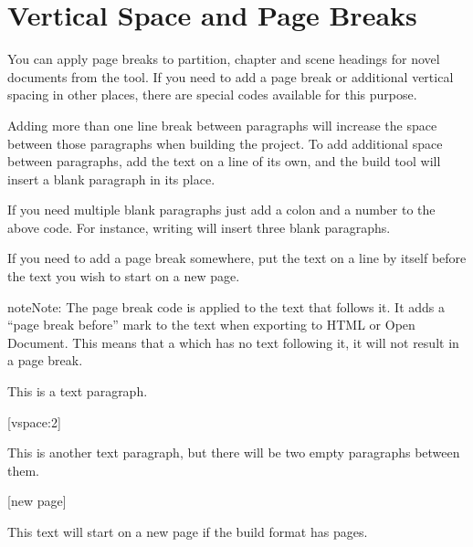 \documentclass[a4paper,11pt,english]{sphinxmanual}
\begin{document}
\section{Vertical Space and Page Breaks}
\label{\detokenize{usage_format:vertical-space-and-page-breaks}}\label{\detokenize{usage_format:a-fmt-break}}
\sphinxAtStartPar
You can apply page breaks to partition, chapter and scene headings for novel documents from the
 tool. If you need to add a page break or additional vertical spacing in other
places, there are special codes available for this purpose.

\sphinxAtStartPar
Adding more than one line break between paragraphs will  increase the space between those
paragraphs when building the project. To add additional space between paragraphs, add the text
\sphinxcode{\sphinxupquote{{[}vspace{]}}} on a line of its own, and the build tool will insert a blank paragraph in its place.

\sphinxAtStartPar
If you need multiple blank paragraphs just add a colon and a number to the above code. For
instance, writing \sphinxcode{\sphinxupquote{{[}vspace:3{]}}} will insert three blank paragraphs.

\sphinxAtStartPar
If you need to add a page break somewhere, put the text  on a line by itself before
the text you wish to start on a new page.

\begin{sphinxadmonition}{note}{Note:}
\sphinxAtStartPar
The page break code is applied to the text that follows it. It adds a “page break before” mark
to the text when exporting to HTML or Open Document. This means that a  which has
no text following it, it will not result in a page break.
\end{sphinxadmonition}

\sphinxAtStartPar
{}

\begin{sphinxVerbatim}[commandchars=\\\{\}]
This is a text paragraph.

[vspace:2]

This is another text paragraph, but there will be two empty paragraphs
between them.

[new page]

This text will start on a new page if the build format has pages.
\end{sphinxVerbatim}
\end{document}
